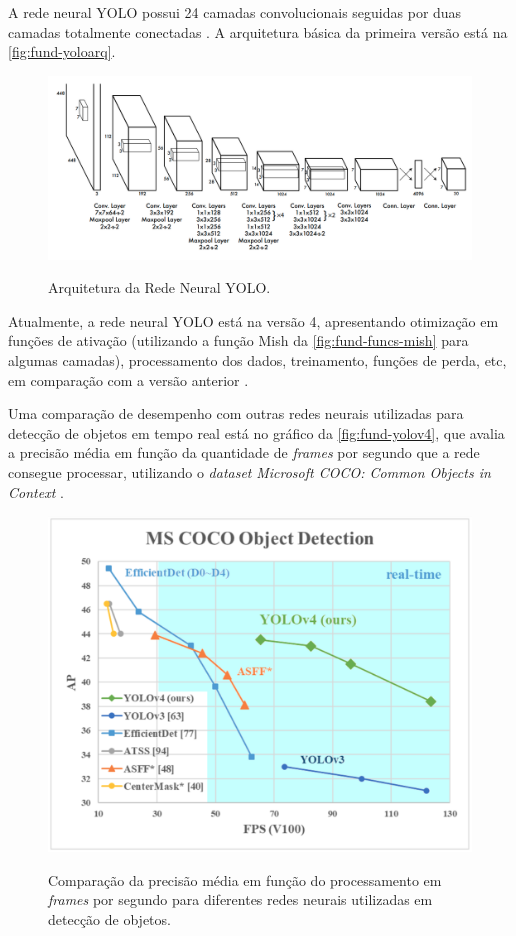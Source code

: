 A rede neural YOLO possui 24 camadas convolucionais seguidas por duas camadas totalmente conectadas \cite{ref:Yan}. A arquitetura básica da primeira versão está na \autoref{fig:fund-yoloarq}.

\begin{figure}[h!] %
  \centering
  \caption{Arquitetura da Rede Neural YOLO.}
  \includegraphics[scale=0.3]{img/img-fundamentacao-yoloarq.png}
  \label{fig:fund-yoloarq}
\end{figure}

Atualmente, a rede neural YOLO está na versão 4, apresentando otimização em funções de ativação (utilizando a função Mish da \autoref{fig:fund-funcs-mish} para algumas camadas), processamento dos dados, treinamento, funções de perda, etc, em comparação com a versão anterior \cite{ref:Wang-et-al}.

Uma comparação de desempenho com outras redes neurais utilizadas para detecção de objetos em tempo real está no gráfico da \autoref{fig:fund-yolov4}, que avalia a precisão média em função da quantidade de \textit{frames} por segundo que a rede consegue processar, utilizando o \textit{dataset} \textit{Microsoft COCO:  Common Objects in Context} \cite{ref:Lin-et-al}.

\begin{figure}[h!] %
  \centering
  \caption{Comparação da precisão média em função do processamento em \textit{frames} por segundo para diferentes redes neurais utilizadas em detecção de objetos.}
  \includegraphics[scale=0.3]{img/img-fundamentacao-yolov4.png}
  \label{fig:fund-yolov4}
\end{figure}

